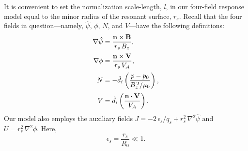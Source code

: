 \documentclass[notitlepage,12pt]{article}
\begin{document}
It is convenient to set the normalization scale-length, $l$, in our four-field response model equal to the minor radius of the resonant surface, $r_s$. 
Recall that the four fields in question---namely, $\hat{\psi}$, $\phi$, $N$, and $V$---have the following
definitions:
\begin{align}\label{e279}
\nabla\hat{\psi} &= \frac{{\bf n}\times{\bf B}} {r_s\,B_z},\\[0.5ex]
\nabla\phi &= \frac{{\bf n}\times {\bf V}}{r_s\,V_A},\\[0.5ex]
N &=-\hat{d}_i\left(\frac{p-p_0}{B_z^{\,2}/\mu_0}\right),\\[0.5ex]
V &= \hat{d}_i\left(\frac{{\bf n}\cdot {\bf V}}{V_A}\right).
\end{align}
 Our
model also employs the auxiliary fields $J=-2\,\epsilon_s/q_s+r_s^2\,\nabla^2 \hat{\psi}$ and  $U=r_s^2\,\nabla^2 \phi$. Here, 
\begin{equation}
\epsilon_s=\frac{r_s}{R_0}\ll 1. 
\end{equation}
\end{document}
